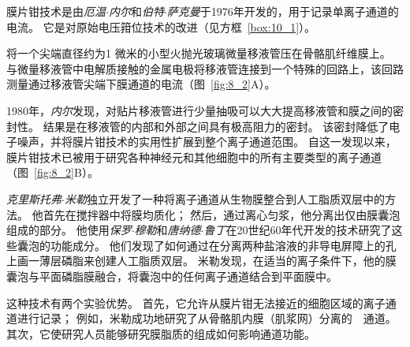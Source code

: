 \begin{proposition} \label{box:8_1}
	
	\quad \quad 膜片钳技术是由\textit{厄温$\cdot$内尔}和\textit{伯特$\cdot$萨克曼}于1976年开发的，用于记录单离子通道的电流。
	它是对原始电压箝位技术的改进（见方框~\ref{box:10_1}）。
	
	\quad \quad 将一个尖端直径约为1 微米的小型火抛光玻璃微量移液管压在骨骼肌纤维膜上。
	与微量移液管中电解质接触的金属电极将移液管连接到一个特殊的回路上，该回路测量通过移液管尖端下膜通道的电流（图~\ref{fig:8_2}A）。
	
	\quad \quad 1980年，\textit{内尔}发现，对贴片移液管进行少量抽吸可以大大提高移液管和膜之间的密封性。
	结果是在移液管的内部和外部之间具有极高阻力的密封。
	该密封降低了电子噪声，并将膜片钳技术的实用性扩展到整个离子通道范围。
	自这一发现以来，膜片钳技术已被用于研究各种神经元和其他细胞中的所有主要类型的离子通道（图~\ref{fig:8_2}B）。
	
	\quad \quad \textit{克里斯托弗$\cdot$米勒}独立开发了一种将离子通道从生物膜整合到人工脂质双层中的方法。
	他首先在搅拌器中将膜均质化；
	然后，通过离心匀浆，他分离出仅由膜囊泡组成的部分。
	他使用\textit{保罗$\cdot$穆勒}和\textit{唐纳德$\cdot$鲁丁}在20世纪60年代开发的技术研究了这些囊泡的功能成分。
	他们发现了如何通过在分离两种盐溶液的非导电屏障上的孔上画一薄层磷脂来创建人工脂质双层。
	米勒发现，在适当的离子条件下，他的膜囊泡与平面磷脂膜融合，将囊泡中的任何离子通道结合到平面膜中。
	
	\quad \quad 这种技术有两个实验优势。
	首先，它允许从膜片钳无法接近的细胞区域的离子通道进行记录；
	例如，米勒成功地研究了从骨骼肌内膜（肌浆网）分离的~~通道。
	其次，它使研究人员能够研究膜脂质的组成如何影响通道功能。
	
\end{proposition}


